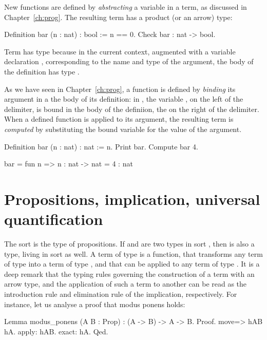 New functions are defined by \emph{abstracting} a variable in a term,
as discussed in Chapter~\ref{ch:prog}. The resulting term has a
product (or an arrow) type:

\begin{coq}{}{}
Definition bar (n : nat) : bool := 
  n == 0.
Check bar : nat -> bool.
\end{coq}

Term  has type  because in the current context,
augmented with a variable declaration , corresponding to
the name and type of the argument, the body  of the definition
 has type .

As we have seen in Chapter~\ref{ch:prog}, a function is defined by
\emph{binding} its argument in a the body of its definition: in
, the variable , on the left of the \C{:=} delimiter, is
bound in the body of the definiion, the  on the right of the \C{:=}
delimiter. When a defined function is applied to its argument, the
resulting term is \emph{computed} by substituting the bound variable
for the value of the argument.

\begin{coq-left}{}{}
Definition bar (n : nat) : nat := n.
Print bar.
Compute bar 4.
\end{coq-left}
\begin{coqout-right}
bar = fun n => n
    : nat -> nat 
= 4
: nat
\end{coqout-right}


\section{Propositions, implication, universal quantification}\label{sec:propiuq}

The sort  is the type of propositions. If  and  are
two types in sort , then  is also a type, living in
sort  as well. A term of type  is a function, that
transforms any term of type  into a term of type , and that
can be applied to any term of type . It is a deep remark that the
typing rules governing the construction of a term with an arrow type,
and the application of such a term to another can be read as the
introduction rule and elimination rule of the implication,
respectively. For instance, let us analyse a proof that modus ponens holds:

\begin{coq}{}{}
Lemma modus_ponens (A B : Prop) : (A -> B) -> A -> B.
Proof.
move=> hAB hA.
apply: hAB.
exact: hA.
Qed.
\end{coq}


